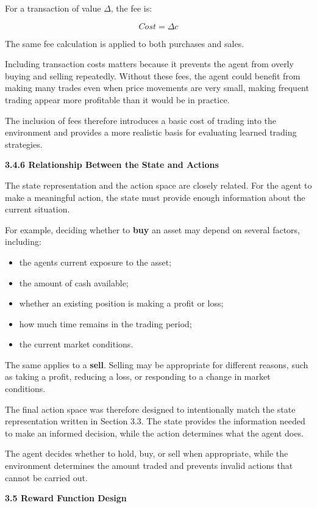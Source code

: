 For a transaction of value \(\Delta\), the fee is:

\[Cost = \Delta c\]

The same fee calculation is applied to both purchases and sales.

Including transaction costs matters because it prevents the agent from
overly buying and selling repeatedly. Without these fees, the agent
could benefit from making many trades even when price movements are very
small, making frequent trading appear more profitable than it would be
in practice.

The inclusion of fees therefore introduces a basic cost of trading into
the environment and provides a more realistic basis for evaluating
learned trading strategies.

\textbf{3.4.6 Relationship Between the State and Actions}

The state representation and the action space are closely related. For
the agent to make a meaningful action, the state must provide enough
information about the current situation.

For example, deciding whether to \textbf{buy} an asset may depend on
several factors, including:

\begin{itemize}
\item
  the agent\textquotesingle s current exposure to the asset;
\item
  the amount of cash available;
\item
  whether an existing position is making a profit or loss;
\item
  how much time remains in the trading period;
\item
  the current market conditions.
\end{itemize}

The same applies to a \textbf{sell}. Selling may be appropriate for
different reasons, such as taking a profit, reducing a loss, or
responding to a change in market conditions.

The final action space was therefore designed to intentionally match the
state representation written in Section 3.3. The state provides the
information needed to make an informed decision, while the action
determines what the agent does.

The agent decides whether to hold, buy, or sell when appropriate, while
the environment determines the amount traded and prevents invalid
actions that cannot be carried out.

\textbf{3.5 Reward Function Design}

